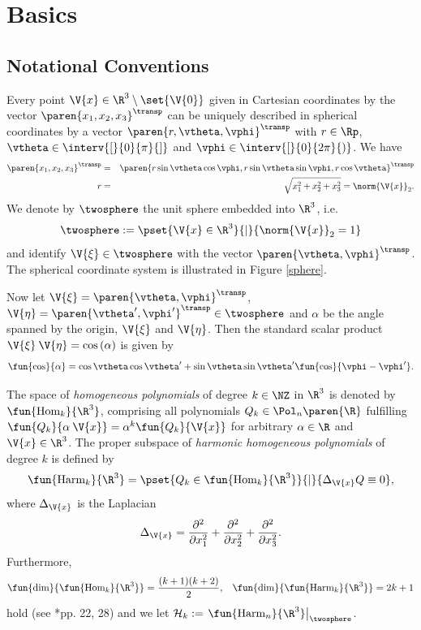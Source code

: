 \chapter{Basics}
\label{Basics}

\section{Notational Conventions}
\label{Basics:Notation}

Every point $\V{x} \in \R^3 \setminus \set{\V{0}}$ given in Cartesian coordinates by the vector 
$\paren{x_1,x_2,x_3}^{\transp}$ can be uniquely described in spherical coordinates by a vector
$\paren{r,\vtheta,\vphi}^{\transp}$ with $r \in \Rp$, $\vtheta \in \interv{[}{0}{\pi}{]}$ and 
$\vphi \in \interv{[}{0}{2\pi}{)}$.
We have
\begin{eqnarray*}
  \paren{x_1,x_2,x_3}^{\transp} & = & \paren{r \sin \vtheta \cos \vphi, r \sin \vtheta \sin \vphi, r \cos \vtheta}^{\transp}\\
  r & = & \sqrt{x_1^2+x_2^2+x_3^2} = \norm{\V{x}}_2.
\end{eqnarray*} 
We denote by $\twosphere$ the unit sphere embedded into $\R^3$, i.e. 
$$\twosphere := \pset{\V{x} \in \R^{3}}{|}{\norm{\V{x}}_2=1}$$ 
and identify $\V{\xi} \in \twosphere$ with the vector $\paren{\vtheta,\vphi}^{\transp}$. The 
spherical coordinate system is illustrated in Figure \ref{sphere}.

Now let $\V{\xi} = \paren{\vtheta,\vphi}^{\transp}$, $\V{\eta} = \paren{\vtheta',\vphi'}^{\transp} \in
\twosphere$ and $\alpha$ be the angle spanned by the origin, $\V{\xi}$ and $\V{\eta}$.
Then the standard scalar product
$\V{\xi} \: \V{\eta} = \cos\left(\alpha\right)$ is given by
\begin{equation}
  \nonumber
  \fun{\cos}{\alpha} = \cos\vtheta\cos\vtheta' +
  \sin\vtheta\sin\vtheta'\fun{\cos}{\vphi-\vphi'}.
\end{equation}

The space of \emph{homogeneous polynomials} of degree $k \in \NZ$ in $\R^3$ is denoted by
$\fun{\text{Hom}_k}{\R^3}$, comprising all polynomials $Q_k \in \Pol_{n}\paren{\R}$ fulfilling 
$\fun{Q_k}{\alpha\:\V{x}} = \alpha^k \fun{Q_k}{\V{x}}$ for arbitrary $\alpha \in \R$ and $\V{x}
\in \R^3$. The proper subspace of \emph{harmonic homogeneous polynomials} of
degree $k$ is defined by
\begin{equation}
  \nonumber
  \fun{\text{Harm}_k}{\R^3} = \pset{Q_k \in \fun{\text{Hom}_k}{\R^3}}{|}{\Delta_{\V{x}} Q \equiv 0},
\end{equation}
where $\Delta_{\V{x}}$ is the Laplacian
\begin{equation}
  \nonumber
  \Delta_{\V{x}} = \frac{\partial^2}{\partial x_1^2} + \frac{\partial^2}{\partial x_2^2} +
  \frac{\partial^2}{\partial x_3^2}.
\end{equation}
Furthermore, 
\begin{align}
  \nonumber
  \fun{\dim}{\fun{\text{Hom}_k}{\R^3}} & = \frac{(k+1)(k+2)}{2}, & 
  \fun{\dim}{\fun{\text{Harm}_k}{\R^3}} = 2k+1
\end{align}
hold (see \cite{freeden}*{pp. 22, 28}) and we let $\mathcal{H}_k := \left.\fun{\text{Harm}_n}{\R^3}\right|_{\twosphere}$.

